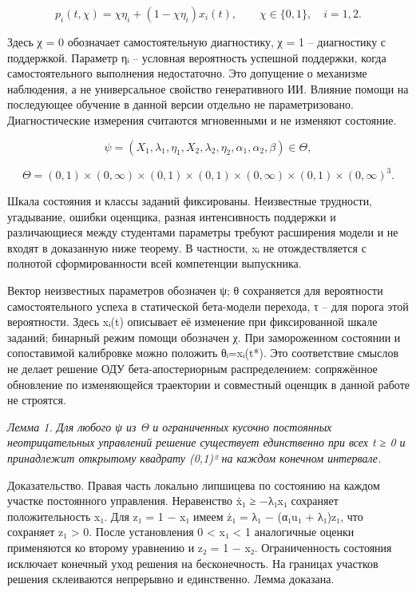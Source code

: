 \documentclass[11pt,a4paper]{article}
\begin{document}
\begin{equation}p_i(t,χ)=χ\eta_i+(1-χ\eta_i)x_i(t),\qquad χ\in\{0,1\},\quad i=1,2.\end{equation}

Здесь χ = 0 обозначает самостоятельную диагностику, χ = 1 – диагностику с поддержкой. Параметр ηᵢ – условная вероятность успешной поддержки, когда самостоятельного выполнения недостаточно. Это допущение о механизме наблюдения, а не универсальное свойство генеративного ИИ. Влияние помощи на последующее обучение в данной версии отдельно не параметризовано. Диагностические измерения считаются мгновенными и не изменяют состояние.\par

\begin{equation}\psi=(X_1,\lambda_1,\eta_1,X_2,\lambda_2,\eta_2,\alpha_1,\alpha_2,\beta)\in\Theta,\end{equation}

\begin{equation}\Theta=(0,1)\times(0,\infty)\times(0,1)\times(0,1)\times(0,\infty)\times(0,1)\times(0,\infty)^3.\end{equation}

Шкала состояния и классы заданий фиксированы. Неизвестные трудности, угадывание, ошибки оценщика, разная интенсивность поддержки и различающиеся между студентами параметры требуют расширения модели и не входят в доказанную ниже теорему. В частности, xᵢ не отождествляется с полнотой сформированности всей компетенции выпускника.\par

Вектор неизвестных параметров обозначен ψ; θ сохраняется для вероятности самостоятельного успеха в статической бета-модели перехода, τ – для порога этой вероятности. Здесь xᵢ(t) описывает её изменение при фиксированной шкале заданий; бинарный режим помощи обозначен χ. При замороженном состоянии и сопоставимой калибровке можно положить θᵢ=xᵢ(t*). Это соответствие смыслов не делает решение ОДУ бета-апостериорным распределением: сопряжённое обновление по изменяющейся траектории и совместный оценщик в данной работе не строятся.\par

\textit{Лемма 1. Для любого ψ из Θ и ограниченных кусочно постоянных неотрицательных управлений решение существует единственно при всех t ≥ 0 и принадлежит открытому квадрату (0,1)² на каждом конечном интервале.}\par

Доказательство. Правая часть локально липшицева по состоянию на каждом участке постоянного управления. Неравенство ẋ₁ ≥ −λ₁x₁ сохраняет положительность x₁. Для z₁ = 1 − x₁ имеем ż₁ = λ₁ − (α₁u₁ + λ₁)z₁, что сохраняет z₁ > 0. После установления 0 < x₁ < 1 аналогичные оценки применяются ко второму уравнению и z₂ = 1 − x₂. Ограниченность состояния исключает конечный уход решения на бесконечность. На границах участков решения склеиваются непрерывно и единственно. Лемма доказана.\par
\end{document}
